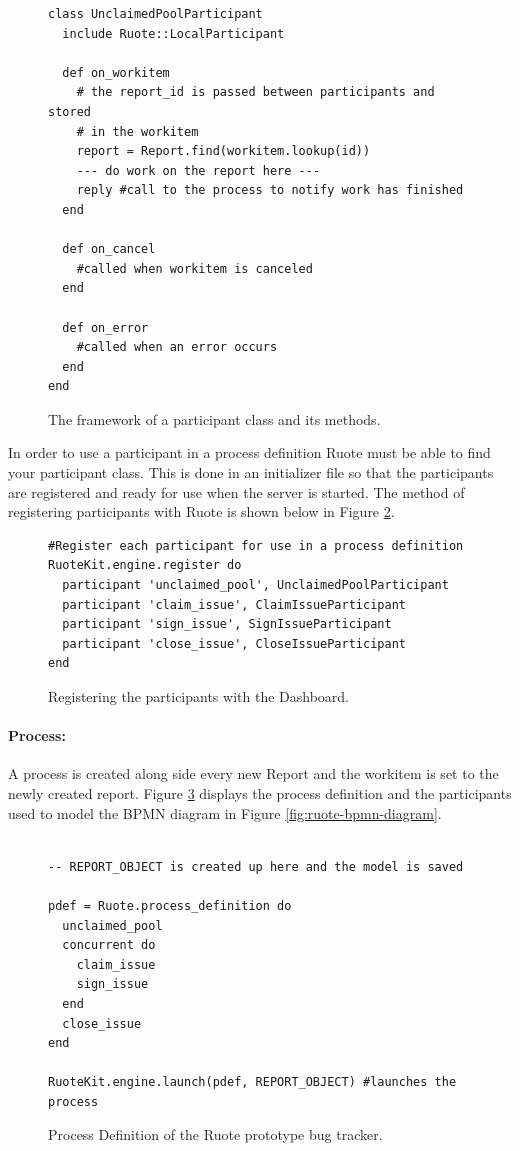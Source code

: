 \documentclass[document.tex]{subfiles}
\begin{document}
\begin{figure}[!ht]
  \begin{lstlisting}
class UnclaimedPoolParticipant
  include Ruote::LocalParticipant

  def on_workitem
    # the report_id is passed between participants and stored
    # in the workitem
    report = Report.find(workitem.lookup(id))
    --- do work on the report here ---
    reply #call to the process to notify work has finished
  end

  def on_cancel
    #called when workitem is canceled
  end

  def on_error
    #called when an error occurs
  end
end
  \end{lstlisting}
  \caption{The framework of a participant class and its methods.}
  \label{fig:ruote-prototype-participant-code}
\end{figure}

In order to use a participant in a process definition Ruote must be able to find your participant class. This is done in an initializer file so that the participants are registered and ready for use when the server is started. The method of registering participants with Ruote is shown below in Figure \ref{fig:ruote-prototype-participant-register}.

\begin{figure}[!ht]
  \begin{lstlisting}
#Register each participant for use in a process definition
RuoteKit.engine.register do
  participant 'unclaimed_pool', UnclaimedPoolParticipant
  participant 'claim_issue', ClaimIssueParticipant
  participant 'sign_issue', SignIssueParticipant
  participant 'close_issue', CloseIssueParticipant
end
  \end{lstlisting}
  \caption{Registering the participants with the Dashboard.}
  \label{fig:ruote-prototype-participant-register}
\end{figure}

\paragraph{Process:} A process is created along side every new Report and the workitem is set to the newly created report. Figure \ref{fig:ruote-prototype-process-definition} displays the process definition and the participants used to model the BPMN diagram in Figure \ref{fig:ruote-bpmn-diagram}.

\begin{figure}[!ht]
  \begin{lstlisting}

-- REPORT_OBJECT is created up here and the model is saved

pdef = Ruote.process_definition do
  unclaimed_pool
  concurrent do
    claim_issue
    sign_issue
  end
  close_issue
end

RuoteKit.engine.launch(pdef, REPORT_OBJECT) #launches the process

  \end{lstlisting}
  \caption{Process Definition of the Ruote prototype bug tracker.}
  \label{fig:ruote-prototype-process-definition}
\end{figure}
\end{document}
